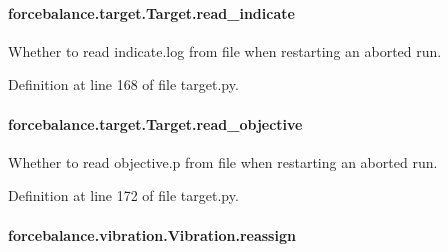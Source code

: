 \hypertarget{classforcebalance_1_1target_1_1Target_aa8af57d5be669c4bb1c0cfd4b7a9220e}{
\paragraph[{read\-\_\-indicate}]{\setlength{\rightskip}{0pt plus 5cm}forcebalance.\-target.\-Target.\-read\-\_\-indicate\hspace{0.3cm}{\ttfamily [inherited]}}}\label{classforcebalance_1_1target_1_1Target_aa8af57d5be669c4bb1c0cfd4b7a9220e}


Whether to read indicate.\-log from file when restarting an aborted run. 



Definition at line 168 of file target.\-py.

\hypertarget{classforcebalance_1_1target_1_1Target_a22bdc4bbce2020ae44b44ad3e444fda6}{
\paragraph[{read\-\_\-objective}]{\setlength{\rightskip}{0pt plus 5cm}forcebalance.\-target.\-Target.\-read\-\_\-objective\hspace{0.3cm}{\ttfamily [inherited]}}}\label{classforcebalance_1_1target_1_1Target_a22bdc4bbce2020ae44b44ad3e444fda6}


Whether to read objective.\-p from file when restarting an aborted run. 



Definition at line 172 of file target.\-py.

\hypertarget{classforcebalance_1_1vibration_1_1Vibration_a6dc3e340d09d4adc415eee905c75b6cc}{
\paragraph[{reassign}]{\setlength{\rightskip}{0pt plus 5cm}forcebalance.\-vibration.\-Vibration.\-reassign\hspace{0.3cm}{\ttfamily [inherited]}}}\label{classforcebalance_1_1vibration_1_1Vibration_a6dc3e340d09d4adc415eee905c75b6cc}


